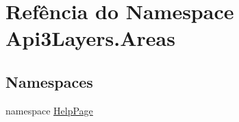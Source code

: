 \hypertarget{namespaceApi3Layers_1_1Areas}{}\section{Refência do Namespace Api3\+Layers.\+Areas}
\label{namespaceApi3Layers_1_1Areas}
\subsection*{Namespaces}
\begin{DoxyCompactItemize}
\item 
namespace \hyperlink{namespaceApi3Layers_1_1Areas_1_1HelpPage}{Help\+Page}
\end{DoxyCompactItemize}
